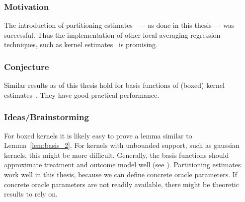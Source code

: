 \subsubsection{Motivation}
The introduction of partitioning estimates~\cite[§4]{Gyorfi2002} --- as done in this thesis --- was successful.
Thus the implementation of other local averaging regression techniques, such as kernel estimates~\cite[§5]{Gyorfi2002}
is promising. 
\subsubsection{Conjecture}
Similar results as of this thesis hold for basis functions of (boxed) kernel estimates~\cite[§5]{Gyorfi2002}.
They have good practical performance.
\subsubsection{Ideas/Brainstorming}
For boxed kernels it is likely easy to prove a lemma similar to Lemma~\ref{lem:basis_2}.
For kernels with unbounded support, such as gaussian kernels, this might be more difficult. 
Generally, the basis functions should approximate treatment and outcome model well (see \cite[Assumptions~1.6 \& 2.3]{Wang2019}).
Partitioning estimates work well in this thesis, because we can define concrete oracle parameters.
If concrete oracle parameters are not readily available, there might be theoretic results to rely on.
